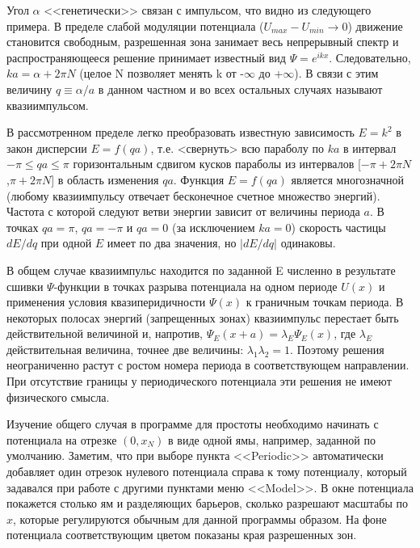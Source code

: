 \documentclass[12pt]{article}
\begin{document}
Угол $\alpha$ <<генетически>> связан с импульсом, что видно из следующего примера. В пределе слабой модуляции потенциала ($U_{max}-U_{min}\to 0$) движение
становится свободным, разрешенная зона занимает весь непрерывный спектр и
распространяющееся решение принимает известный вид $\Psi=e^{ikx}$.
Следовательно,
$ka=\alpha+2\pi N$ (целое N позволяет менять k от -$\infty$ до +$\infty$).
В связи с этим величину $q \equiv\alpha/a$ в данном частном и во всех
остальных случаях называют квазиимпульсом.

В рассмотренном пределе
легко преобразовать известную зависимость
$E=k^2$ в закон дисперсии $E=f(qa)$, т.е.
<свернуть> всю параболу по $ka$ в интервал $-\pi\le qa\le\pi$
горизонтальным сдвигом кусков параболы из интервалов
[$-\pi+2\pi N$,$\pi+2\pi N$] в область изменения $qa$. Функция
$E=f(qa)$ является многозначной (любому квазиимпульсу отвечает бесконечное счетное множество энергий). Частота с которой
следуют ветви энергии зависит от величины периода $a$. В точках  $qa=\pi$, $qa=-\pi$ и $qa=0$ (за исключением $ka=0$) скорость частицы $dE/dq$ при одной $E$ имеет по два значения, но $|dE/dq|$ одинаковы.

В общем случае
квазиимпульс находится по заданной E численно в результате
сшивки $\Psi$-функции в точках разрыва потенциала на одном периоде $U(x)$
и применения условия квазиперидичности $\Psi(x)$ к граничным точкам периода. В некоторых полосах энергий (запрещенных зонах) квазиимпульс перестает быть действительной величиной и, напротив,
$\Psi_E(x+a)=\lambda_E\Psi_E(x)$, где $\lambda_E$ действительная величина, точнее две величины: $\lambda_1\lambda_2=1$. Поэтому   решения неограниченно растут с ростом номера периода в соответствующем направлении. При отсутствие границы у периодического потенциала эти решения не имеют физического смысла.



Изучение общего случая в программе для простоты необходимо начинать с потенциала на
отрезке $(0,x_N)$ в виде одной ямы, например, заданной по умолчанию. Заметим, что при выборе пункта <<Periodic>> автоматически
добавляет один отрезок нулевого потенциала справа к тому потенциалу, который задавался при работе с другими пунктами
меню <<Model>>.  В окне потенциала покажется столько ям и разделяющих барьеров, сколько разрешают масштабы по $x$,
которые регулируются обычным для данной программы образом. На фоне потенциала соответствующим цветом показаны
края разрешенных зон.
\end{document}
